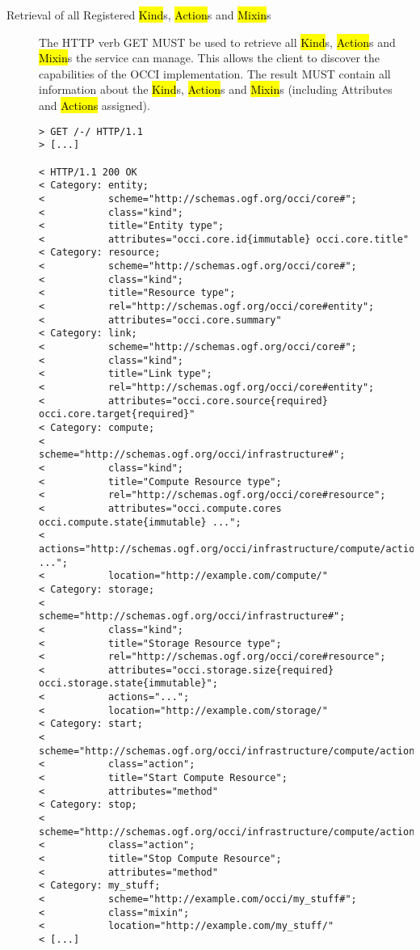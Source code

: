 \documentclass[10pt,a4paper]{article}
\begin{document}
\begin{description}
  \item[Retrieval of all Registered \hl{Kind}s, \hl{Action}s and
    \hl{Mixin}s] The HTTP verb GET MUST be used to retrieve all
    \hl{Kind}s, \hl{Action}s and \hl{Mixin}s the service can
    manage. This allows the client to discover the capabilities of the
    OCCI implementation. The result MUST contain all information about
    the \hl{Kind}s, \hl{Action}s and \hl{Mixin}s (including Attributes
    and \hl{Actions} assigned).

\begin{verbatim}
> GET /-/ HTTP/1.1
> [...]

< HTTP/1.1 200 OK
< Category: entity;
<           scheme="http://schemas.ogf.org/occi/core#";
<           class="kind";
<           title="Entity type";
<           attributes="occi.core.id{immutable} occi.core.title"
< Category: resource;
<           scheme="http://schemas.ogf.org/occi/core#";
<           class="kind";
<           title="Resource type";
<           rel="http://schemas.ogf.org/occi/core#entity";
<           attributes="occi.core.summary"
< Category: link;
<           scheme="http://schemas.ogf.org/occi/core#";
<           class="kind";
<           title="Link type";
<           rel="http://schemas.ogf.org/occi/core#entity";
<           attributes="occi.core.source{required} occi.core.target{required}"
< Category: compute;
<           scheme="http://schemas.ogf.org/occi/infrastructure#";
<           class="kind";
<           title="Compute Resource type";
<           rel="http://schemas.ogf.org/occi/core#resource";
<           attributes="occi.compute.cores occi.compute.state{immutable} ...";
<           actions="http://schemas.ogf.org/occi/infrastructure/compute/action#stop ...";
<           location="http://example.com/compute/"
< Category: storage;
<           scheme="http://schemas.ogf.org/occi/infrastructure#";
<           class="kind";
<           title="Storage Resource type";
<           rel="http://schemas.ogf.org/occi/core#resource";
<           attributes="occi.storage.size{required} occi.storage.state{immutable}";
<           actions="...";
<           location="http://example.com/storage/"
< Category: start;
<           scheme="http://schemas.ogf.org/occi/infrastructure/compute/action#";
<           class="action";
<           title="Start Compute Resource";
<           attributes="method"
< Category: stop;
<           scheme="http://schemas.ogf.org/occi/infrastructure/compute/action#";
<           class="action";
<           title="Stop Compute Resource";
<           attributes="method"
< Category: my_stuff;
<           scheme="http://example.com/occi/my_stuff#";
<           class="mixin";
<           location="http://example.com/my_stuff/"
< [...]
\end{verbatim}


\end{description}
\end{document}
